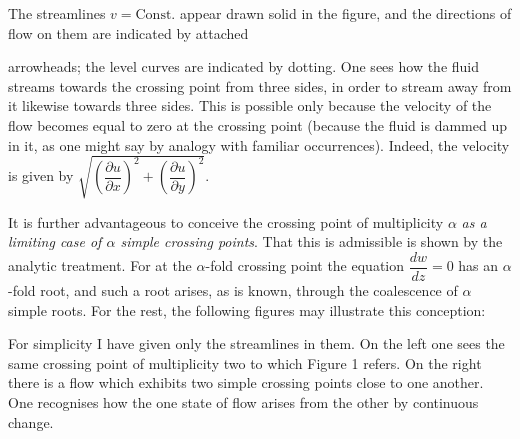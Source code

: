 \documentclass{article}
\begin{document}

The streamlines $v = \text{Const.}$ appear drawn solid in the figure, and the directions of flow on them are indicated by attached

arrowheads; the level curves are indicated by dotting. One sees how the fluid streams towards the crossing point from three sides, in order to stream away from it likewise towards three sides. This is possible only because the velocity of the flow becomes equal to zero at the crossing point (because the fluid is dammed up in it, as one might say by analogy with familiar occurrences). Indeed, the velocity is given by $\sqrt{\left(\dfrac{\partial u}{\partial x}\right)^{2} + \left(\dfrac{\partial u}{\partial y}\right)^{2}}$.

It is further advantageous to conceive the crossing point of multiplicity $\alpha$ \emph{as a limiting case of $\alpha$ simple crossing points}. That this is admissible is shown by the analytic treatment. For at the $\alpha$-fold crossing point the equation $\dfrac{dw}{dz} = 0$ has an $\alpha$-fold root, and such a root arises, as is known, through the coalescence of $\alpha$ simple roots. For the rest, the following figures may illustrate this conception:


For simplicity I have given only the streamlines in them. On the left one sees the same crossing point of multiplicity two to which Figure 1 refers. On the right there is a flow which exhibits two simple crossing points close to one another. One recognises how the one state of flow arises from the other by continuous change.
\end{document}
